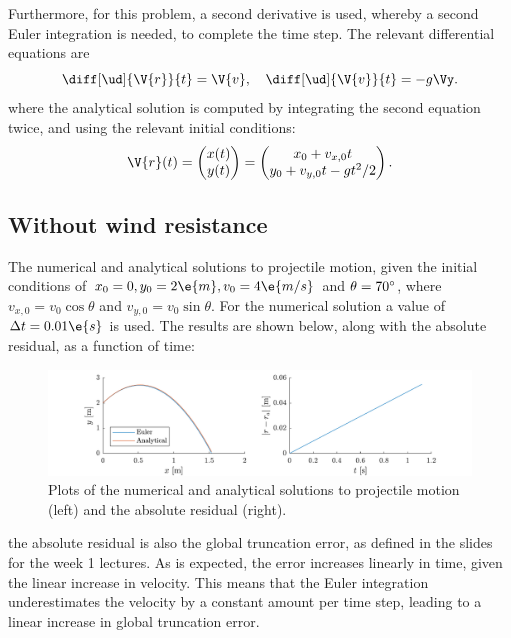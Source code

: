 \documentclass[a4paper,10pt]{article} 	%
\numberwithin{equation}{section}
\begin{document}
	Furthermore, for this problem, a second derivative is used, whereby a second Euler integration is needed, to complete the time step. The relevant differential equations are
	\begin{equation}
		\diff[\ud]{\V{r}}{t} = \V{v}, \quad \diff[\ud]{\V{v}}{t} = -g\Vy.
	\end{equation}
	where the analytical solution is computed by integrating the second equation twice, and using the relevant initial conditions:
	\begin{equation}
		\V{r}(t) = \begin{pmatrix}
		x(t) \\ y(t)
		\end{pmatrix} = \begin{pmatrix}
		x_0+v_{x,0} t \\ y_0+v_{y,0}t-gt^2/2
		\end{pmatrix}. 
	\end{equation}
	
	
	\subsection{Without wind resistance}
	The numerical and analytical solutions to projectile motion, given the initial conditions of $ x_0 = 0,y_0 = 2 \e{m},v_0 = 4 \e{m/s}$ and $ \theta = 70\degree$, where $ v_{x,0} = v_0 \cos \theta $ and $ v_{y,0} = v_0 \sin \theta $. For the numerical solution a value of $ \Delta t = 0.01 \e{s}$ is used. The results are shown below, along with the absolute residual, as a function of time:
	\begin{figure}[H]
		\centering
		\includegraphics[width=\linewidth]{projectile.pdf}
		\caption{Plots of the numerical and analytical solutions to projectile motion (left) and the absolute residual (right).}
		\label{fig:projectile}
	\end{figure}
	the absolute residual is also the global truncation error, as defined in the slides for the week 1 lectures. As is expected, the error increases linearly in time, given the linear increase in velocity. This means that the Euler integration underestimates the velocity by a constant amount per time step, leading to a linear increase in global truncation error.
	
\end{document}
